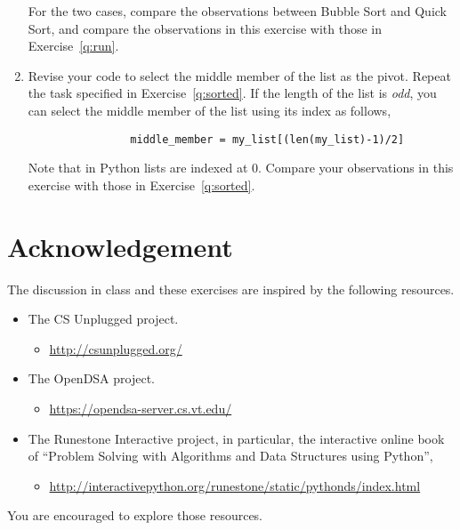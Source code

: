 \documentclass[11pt,letterpaper]{article}
\begin{document}
\begin{enumerate}
\begin{enumerate}
        \end{enumerate}
        For the two cases, compare the observations between Bubble Sort and
        Quick Sort, and compare the observations in this exercise with 
        those in Exercise~\ref{q:run}.

    \item Revise your code to select the middle member of the list as the
        pivot. Repeat the task specified in Exercise~\ref{q:sorted}. If the
        length of the list is {\em odd}, you can select the middle member of
        the list using its index as follows,

                \begin{verbatim}
                middle_member = my_list[(len(my_list)-1)/2]
                \end{verbatim}

        Note that in Python lists are indexed at $0$. Compare your observations
        in this exercise with those in Exercise~\ref{q:sorted}.

\end{enumerate}

\section{Acknowledgement}

The discussion in class and these exercises are inspired by the following
resources. 

\begin{itemize}

    \item The CS Unplugged project.
        \begin{itemize}
            \item \url{http://csunplugged.org/}
        \end{itemize}

    \item The OpenDSA project.
        \begin{itemize}
            \item \url{https://opendsa-server.cs.vt.edu/}
        \end{itemize}

    \item The Runestone Interactive project, in particular, the interactive
        online book of ``Problem Solving with Algorithms and Data Structures
        using Python'',

        \begin{itemize}
            \item \url{http://interactivepython.org/runestone/static/pythonds/index.html}
        \end{itemize}

\end{itemize}
You are encouraged to explore those resources. 
\end{document}
